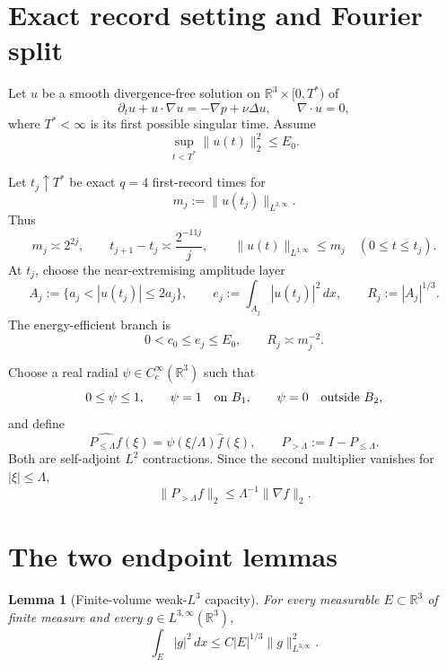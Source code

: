 \documentclass[11pt]{article}
\newtheorem{lemma}[theorem]{Lemma}
\theoremstyle{remark}
\newcommand{\R}{\mathbb R}
\begin{document}
\section{Exact record setting and Fourier split}

Let \(u\) be a smooth divergence-free solution on
\(\R^3\times[0,T^*)\) of
\[
 \partial_tu+u\cdot\nabla u=-\nabla p+\nu\Delta u,
 \qquad
 \nabla\cdot u=0,
\]
where \(T^*<\infty\) is its first possible singular time.  Assume
\begin{equation}
 \label{eq:energy-bound}
 \sup_{t<T^*}\|u(t)\|_2^2\leq E_0.
\end{equation}

Let \(t_j\uparrow T^*\) be exact \(q=4\) first-record times for
\[
 m_j:=\|u(t_j)\|_{L^{3,\infty}}.
\]
Thus
\begin{equation}
 \label{eq:q4}
 m_j\asymp2^{2j},
 \qquad
 t_{j+1}-t_j\asymp\frac{2^{-11j}}j,
 \qquad
 \|u(t)\|_{L^{3,\infty}}\leq m_j
 \quad(0\leq t\leq t_j).
\end{equation}
At \(t_j\), choose the near-extremising amplitude layer
\[
 A_j:=\{a_j<|u(t_j)|\leq2a_j\},
 \qquad
 e_j:=\int_{A_j}|u(t_j)|^2\,dx,
 \qquad
 R_j:=|A_j|^{1/3}.
\]
The energy-efficient branch is
\begin{equation}
 \label{eq:layer-energy}
 0<c_0\leq e_j\leq E_0,
 \qquad
 R_j\asymp m_j^{-2}.
\end{equation}

Choose a real radial \(\psi\in C_c^\infty(\R^3)\) such that
\[
 0\leq\psi\leq1,\qquad
 \psi=1\quad\hbox{on }B_1,\qquad
 \psi=0\quad\hbox{outside }B_2,
\]
and define
\begin{equation}
 \label{eq:LP}
 \widehat{P_{\leq\Lambda}f}(\xi)
 =\psi(\xi/\Lambda)\widehat f(\xi),
 \qquad
 P_{>\Lambda}:=I-P_{\leq\Lambda}.
\end{equation}
Both are self-adjoint \(L^2\) contractions.  Since the second multiplier
vanishes for \(|\xi|\leq\Lambda\),
\begin{equation}
 \label{eq:bernstein-high}
 \|P_{>\Lambda}f\|_2
 \leq\Lambda^{-1}\|\nabla f\|_2.
\end{equation}

\section{The two endpoint lemmas}

\begin{lemma}[Finite-volume weak-\(L^3\) capacity]
\label{lem:capacity}
For every measurable \(E\subset\R^3\) of finite measure and every
\(g\in L^{3,\infty}(\R^3)\),
\begin{equation}
 \label{eq:capacity}
 \int_E|g|^2\,dx
 \leq C|E|^{1/3}\|g\|_{L^{3,\infty}}^2.
\end{equation}
\end{lemma}
\end{document}
